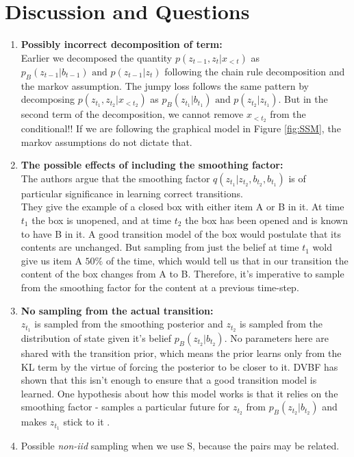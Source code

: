 \documentclass[10pt,twocolumn,letterpaper]{article}
\begin{document}
\section{Discussion and Questions}
	\begin{enumerate}
		\item \textbf{Possibly incorrect decomposition of term: }\\Earlier we decomposed the quantity $p(z_{t-1}, z_t| x_{< t})$ as $p_B(z_{t-1}|b_{t-1}) \text{ and } p(z_{t-1}|z_t)$ following the chain rule decomposition and the markov assumption. The jumpy loss follows the same pattern by decomposing $p(z_{t_1}, z_{t_2}| x_{< t_2})$ as $p_B(z_{t_1}|b_{t_1}) \text{ and } p(z_{t_2}|z_{t_1})$. But in the second term of the decomposition, we cannot remove $x_{< t_2}$ from the conditional!! If we are following the graphical model in Figure \ref{fig:SSM}, the markov assumptions do not dictate that.
		\item \textbf{The possible effects of including the smoothing factor: }\\
		The authors argue that the smoothing factor $q(z_{t_1}| z_{t_2}, b_{t_2}, b_{t_1})$ is of particular significance in learning correct transitions. \vspace{4mm} \\
		They give the example of a closed box with either item A or B in it. At time $t_1$ the box is unopened, and at time $t_2$ the box has been opened and is known to have B in it. A good transition model of the box would postulate that its contents are unchanged. But sampling from just the belief at time $t_1$ wold give us item A $50\%$ of the time, which would tell us that in our transition the content of the box changes from A to B. Therefore, it's imperative to sample from the smoothing factor for the content at a previous time-step.
		\item \textbf{No sampling from the actual transition: } \\
		$z_{t_1}$ is sampled from the smoothing posterior and $z_{t_2}$ is sampled from the distribution of state given it's belief $p_B(z_{t_2}|b_{t_2})$. No parameters here are shared with the transition prior, which means the prior learns only from the KL term by the virtue of forcing the posterior to be closer to it. DVBF\cite{karl2016deep} has shown that this isn't enough to ensure that a good transition model is learned. One hypothesis about how this model works is that it relies on the smoothing factor - samples a particular future for $z_{t_2}$ from $p_B(z_{t_2}|b_{t_2})$ and makes $z_{t_1}$ stick to it .
		\item Possible \emph{non-iid} sampling when we use S, because the pairs may be related.
	\end{enumerate}

	
	
	
\end{document}
